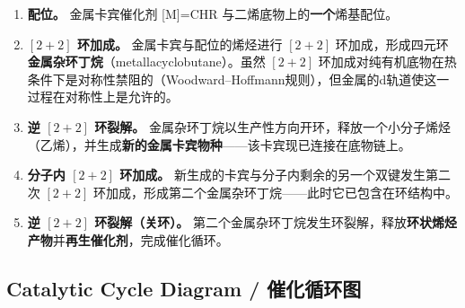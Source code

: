 \documentclass[11pt, a4paper]{article}
\begin{document}
\begin{cnbox}[中文 --- 逐步解析]
\begin{enumerate}[label=\textbf{第\chinese{enumi}步：}, leftmargin=2.5cm]
  \item \textbf{配位。} 金属卡宾催化剂 [M]=CHR 与二烯底物上的\textbf{一个}烯基配位。

  \item \textbf{$[2+2]$ 环加成。} 金属卡宾与配位的烯烃进行 $[2+2]$ 环加成，形成四元环\textbf{金属杂环丁烷}（metallacyclobutane）。虽然 $[2+2]$ 环加成对纯有机底物在热条件下是对称性禁阻的（Woodward--Hoffmann规则），但金属的d轨道使这一过程在对称性上是允许的。

  \item \textbf{逆 $[2+2]$ 环裂解。} 金属杂环丁烷以生产性方向开环，释放一个小分子烯烃（乙烯），并生成\textbf{新的金属卡宾物种}——该卡宾现已连接在底物链上。

  \item \textbf{分子内 $[2+2]$ 环加成。} 新生成的卡宾与分子内剩余的另一个双键发生第二次 $[2+2]$ 环加成，形成第二个金属杂环丁烷——此时它已包含在环结构中。

  \item \textbf{逆 $[2+2]$ 环裂解（关环）。} 第二个金属杂环丁烷发生环裂解，释放\textbf{环状烯烃产物}并\textbf{再生催化剂}，完成催化循环。
\end{enumerate}
\end{cnbox}

\subsection{Catalytic Cycle Diagram / 催化循环图}
\end{document}
